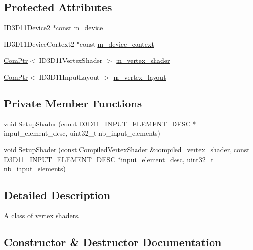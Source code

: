 \subsection*{Protected Attributes}
\begin{DoxyCompactItemize}
\item 
I\+D3\+D11\+Device2 $\ast$const \hyperlink{classmage_1_1_vertex_shader_a112021bb8067fb4a66870b125403354a}{m\+\_\+device}
\item 
I\+D3\+D11\+Device\+Context2 $\ast$const \hyperlink{classmage_1_1_vertex_shader_a1c286b3eafd0a0b45beb2b17065f0f0e}{m\+\_\+device\+\_\+context}
\item 
\hyperlink{namespacemage_ae74f374780900893caa5555d1031fd79}{Com\+Ptr}$<$ I\+D3\+D11\+Vertex\+Shader $>$ \hyperlink{classmage_1_1_vertex_shader_a0b2b02abae4cb226c115d7f1c5464a54}{m\+\_\+vertex\+\_\+shader}
\item 
\hyperlink{namespacemage_ae74f374780900893caa5555d1031fd79}{Com\+Ptr}$<$ I\+D3\+D11\+Input\+Layout $>$ \hyperlink{classmage_1_1_vertex_shader_a9b9895650b8c7f80af846d75f7d9ddda}{m\+\_\+vertex\+\_\+layout}
\end{DoxyCompactItemize}
\subsection*{Private Member Functions}
\begin{DoxyCompactItemize}
\item 
void \hyperlink{classmage_1_1_vertex_shader_a3de0e623c3c4d81b580386fc13f85323}{Setup\+Shader} (const D3\+D11\+\_\+\+I\+N\+P\+U\+T\+\_\+\+E\+L\+E\+M\+E\+N\+T\+\_\+\+D\+E\+SC $\ast$input\+\_\+element\+\_\+desc, uint32\+\_\+t nb\+\_\+input\+\_\+elements)
\item 
void \hyperlink{classmage_1_1_vertex_shader_accc6b2560c08e99689eda71472e95814}{Setup\+Shader} (const \hyperlink{structmage_1_1_compiled_vertex_shader}{Compiled\+Vertex\+Shader} \&compiled\+\_\+vertex\+\_\+shader, const D3\+D11\+\_\+\+I\+N\+P\+U\+T\+\_\+\+E\+L\+E\+M\+E\+N\+T\+\_\+\+D\+E\+SC $\ast$input\+\_\+element\+\_\+desc, uint32\+\_\+t nb\+\_\+input\+\_\+elements)
\end{DoxyCompactItemize}


\subsection{Detailed Description}
A class of vertex shaders. 

\subsection{Constructor \& Destructor Documentation}
\hypertarget{classmage_1_1_vertex_shader_ae1cae27fde45f87829330474d13a579f}{}\label{classmage_1_1_vertex_shader_ae1cae27fde45f87829330474d13a579f} 

